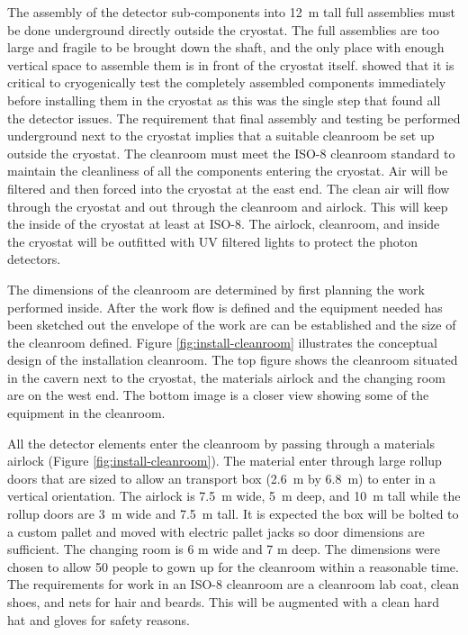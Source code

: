 The assembly of the detector sub-components into \SI{12}{m} tall full assemblies must be done underground directly outside the cryostat. 
The full assemblies are too large and fragile to be brought down the shaft, and the only place with enough vertical space to assemble them is in front of the cryostat itself. 
 showed that it is critical to cryogenically test the completely assembled components immediately before installing them in the cryostat as this was the single step that found all the detector issues. 
The requirement that final assembly and testing be performed underground next to the cryostat implies that a suitable cleanroom be set up outside the cryostat. 
The cleanroom must meet the ISO-8 cleanroom standard to maintain the cleanliness of all the components entering the cryostat.  
Air will be filtered and then forced into the cryostat at the east end. The clean air will flow through the cryostat and out through the cleanroom and airlock. 
This will keep the inside of the cryostat at least at ISO-8.  
The airlock, cleanroom, and inside the cryostat will be outfitted with UV filtered lights to protect the photon detectors.

The dimensions of the cleanroom are determined by first planning the work performed inside. After the work flow is defined and the equipment needed has been sketched out the envelope of the work are can be established and the size of the cleanroom defined. Figure \ref{fig:install-cleanroom} illustrates  the conceptual design of the installation cleanroom. The top figure shows the cleanroom situated in the cavern next to the cryostat, the materials airlock and the changing room are on the west end. The bottom image is a closer view showing some of the equipment in the cleanroom. 



All the detector elements enter the cleanroom by passing through a materials airlock (Figure \ref{fig:install-cleanroom}). 
The material enter through large rollup doors that are sized to allow an  transport box (\SI{2.6}{m} by \SI{6.8}{m}) to enter in a vertical orientation. 
The airlock is \SI{7.5}{m} wide, \SI{5}{m} deep, and \SI{10}{m} tall while the rollup doors are \SI{3}{m} wide and \SI{7.5}{m} tall. 
It is expected the  box will be bolted to a custom pallet and moved with electric pallet jacks so door dimensions are sufficient. 
The changing room is 6 \si{m} wide and 7 \si{m} deep. 
The dimensions were chosen to allow 50 people to gown up for the cleanroom within a reasonable time. 
The requirements for work in an ISO-8 cleanroom are a cleanroom lab coat, clean shoes, and nets for hair and beards.  
This will be augmented with a clean hard hat and gloves for safety reasons. 



